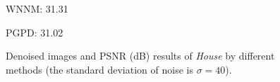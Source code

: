 \begin{figure}[t!]
{\begin{minipage}[t]{0.24\textwidth}
{\footnotesize WNNM: 31.31}
\end{minipage}
\begin{minipage}[t]{0.24\textwidth}
\centering
{}
{\footnotesize PGPD: 31.02}
\end{minipage}
}\vspace{-3mm}
\caption{Denoised images and PSNR (dB) results of \textsl{House} by different methods (the standard deviation of noise is $\sigma=40$).}
    \label{fig2-11}
\vspace{-4mm}
\end{figure}

